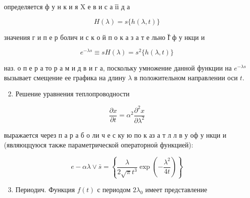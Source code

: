 \documentclass[10pt]{article}
\begin{document}
определяется ф у н к и я $\mathrm{X}$ е в и с а їі д а



\[

H(\lambda)=s\{h(\lambda, t)\}

\]



значения г и п е р болич и с к о й п о к а з а т е льно Ї̈ ф у нкци и



\[

e^{-\lambda s} \equiv s H(\lambda)=s^{2}\{h(\lambda, t)\}

\]



наз. о п е р а то р а м и д в и г а, поскольку умножение данной функции на $e^{-\lambda s}$ вызывает смещение ее графика на длину $\lambda$ в положительном направлении оси $t$.



\begin{enumerate}

  \setcounter{enumi}{1}

  \item Решение уравнения теплопроводности

\end{enumerate}



\[

\frac{\partial x}{\partial t}=\alpha^{2} \frac{\partial^{2} x}{\partial \lambda^{2}}

\]



выражается через п а р а б о ли ч е с ку ю по к аз а т л л в у оф у нкци и (являюццуюся также параметрической операторноӥ функцией):



\[

e-\alpha \lambda \vee \bar{s}=\left\{\frac{\lambda}{2 \sqrt{\pi} t^{3}} \exp \left(-\frac{\lambda^{2}}{4 t}\right)\right\}

\]



\begin{enumerate}

  \setcounter{enumi}{2}

  \item Периодич. Функция $f(t)$ с периодом $2 \lambda_{0}$ имеет представление

\end{enumerate}
\end{document}
